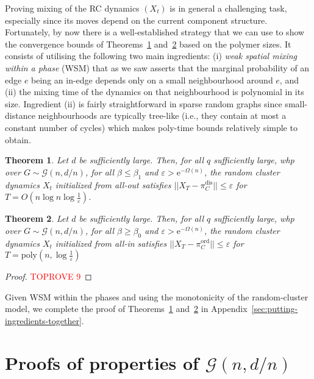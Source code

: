 \documentclass[11pt]{article}
\theoremstyle{plain}
\newtheorem{theorem}{Theorem}
\let\epsilon=\varepsilon
\newcommand{\G}{\mathcal{G}}
\newcommand{\emm}{\mathrm{e}}
\newcommand{\1}{\mathbb{1}}
\newcommand{\ord}{\mathrm{ord}}
\newcommand{\dis}{\mathrm{dis}}
\begin{document}
Proving mixing of the RC dynamics $(X_t)$ is in general a challenging task, especially since its moves depend on the current component structure. Fortunately, by now there is a well-established strategy \cite{SinclairsGheissari2022, Galanis_Goldberg_Smolarova_2024, galanis2024plantingmcmcsamplingpottsarxiv} that we can use to show the convergence bounds of Theorems~\ref{thm:disordered-mixing} and~\ref{thm:ordered-mixing} based on the polymer sizes. It consists of utilising the following two main ingredients: (i)  \textit{weak spatial mixing within a phase} (WSM) that as we saw asserts that the marginal probability of an edge $e$ being an in-edge depends only on a small neighbourhood around $e$, and (ii) the mixing time of the dynamics on that neighbourhood is polynomial in its size.  Ingredient (ii) is fairly straightforward in sparse random graphs since small-distance neighbourhoods are typically tree-like (i.e., they contain at most a constant number of cycles) which makes poly-time bounds relatively simple to obtain.
\begin{theorem}\label{thm:disordered-mixing}
    Let $d$ be sufficiently large. Then, for all $q$ sufficiently large,  whp over \(G\sim\G(n,d/n)\), for all \(\beta \leq \beta_1\) and \(\epsilon > \emm^{-\Omega(n)}\), the random cluster dynamics \(X_t\) initialized from all-out satisfies \(||X_T - \pi^\dis_C|| \leq \epsilon\) for \(T = O(n\log n\log\tfrac 1\epsilon)\).
\end{theorem}

\begin{theorem}\label{thm:ordered-mixing}
    Let $d$ be sufficiently large. Then, for all $q$ sufficiently large,  whp over \(G\sim\G(n,d/n)\), for all $\beta\geq \beta_0$ and \(\epsilon > \emm^{-\Omega(n)}\), the random cluster dynamics \(X_t\) initialized from all-in satisfies \(||X_T-\pi^\ord_C||\leq\epsilon\) for \(T = \mathrm{poly}(n,\log\frac{1}{\epsilon})\)
\end{theorem}

\begin{proof}\textcolor{red}{TOPROVE 9}\end{proof}
Given WSM within the phases and using the monotonicity of the random-cluster model, we complete the proof of Theorems~\ref{thm:disordered-mixing} and~\ref{thm:ordered-mixing} in Appendix~\ref{sec:putting-ingredients-together}.



\appendix

\section{Proofs of properties of \(\G(n,d/n)\)}\label{sec:graph-proofs}
\end{document}
